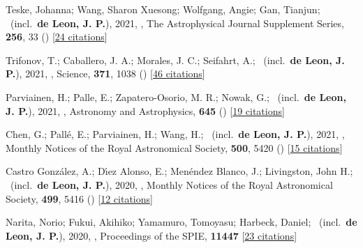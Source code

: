 \item[{\color{numcolor}\scriptsize36}] Teske, Johanna; Wang, Sharon Xuesong; Wolfgang, Angie; Gan, Tianjun; \etal\ (incl.\ \textbf{de Leon, J. P.}), 2021, , The Astrophysical Journal Supplement Series, \textbf{256}, 33 () [\href{https://ui.adsabs.harvard.edu/abs/2021ApJS..256...33T}{24 citations}]

\item[{\color{numcolor}\scriptsize35}] Trifonov, T.; Caballero, J. A.; Morales, J. C.; Seifahrt, A.; \etal\ (incl.\ \textbf{de Leon, J. P.}), 2021, , Science, \textbf{371}, 1038 () [\href{https://ui.adsabs.harvard.edu/abs/2021Sci...371.1038T}{46 citations}]

\item[{\color{numcolor}\scriptsize34}] Parviainen, H.; Palle, E.; Zapatero-Osorio, M. R.; Nowak, G.; \etal\ (incl.\ \textbf{de Leon, J. P.}), 2021, , Astronomy and Astrophysics, \textbf{645} () [\href{https://ui.adsabs.harvard.edu/abs/2021A&A...645A..16P}{19 citations}]

\item[{\color{numcolor}\scriptsize33}] Chen, G.; Pall{\'e}, E.; Parviainen, H.; Wang, H.; \etal\ (incl.\ \textbf{de Leon, J. P.}), 2021, , Monthly Notices of the Royal Astronomical Society, \textbf{500}, 5420 () [\href{https://ui.adsabs.harvard.edu/abs/2021MNRAS.500.5420C}{15 citations}]

\item[{\color{numcolor}\scriptsize32}] Castro Gonz{\'a}lez, A.; D{\'\i}ez Alonso, E.; Men{\'e}ndez Blanco, J.; Livingston, John H.; \etal\ (incl.\ \textbf{de Leon, J. P.}), 2020, , Monthly Notices of the Royal Astronomical Society, \textbf{499}, 5416 () [\href{https://ui.adsabs.harvard.edu/abs/2020MNRAS.499.5416C}{12 citations}]

\item[{\color{numcolor}\scriptsize31}] Narita, Norio; Fukui, Akihiko; Yamamuro, Tomoyasu; Harbeck, Daniel; \etal\ (incl.\ \textbf{de Leon, J. P.}), 2020, , Proceedings of the SPIE, \textbf{11447} [\href{https://www.spiedigitallibrary.org/conference-proceedings-of-spie/10925/1092507/Focus-adjustable-motion-blur-compensation-method-using-deformable-mirror/10.1117/12.2509567.short}{23 citations}]


